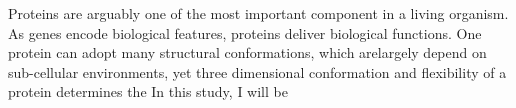 Proteins are arguably one of the most important component in a living organism. As genes encode biological features, proteins deliver biological functions. One protein can adopt many structural conformations, which arelargely depend on sub-cellular environments, yet three dimensional conformation and flexibility of a protein determines the     In this study, I will be 